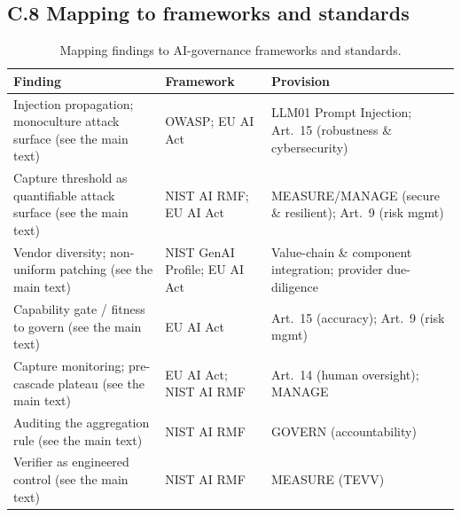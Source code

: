 \documentclass[11pt,a4paper]{article}
\begin{document}
\subsection*{C.8 Mapping to frameworks and standards}
\begin{table}[t]
\caption{Mapping findings to AI-governance frameworks and standards.}
\label{tab:policy}
\small
\begin{tabular}{@{}p{2.7cm}p{2.0cm}p{2.4cm}@{}}
\toprule
\textbf{Finding} & \textbf{Framework} & \textbf{Provision} \\
\midrule
Injection propagation; monoculture attack surface (see the main text) & OWASP; EU AI Act & LLM01 Prompt Injection; Art.~15 (robustness \& cybersecurity) \\
Capture threshold as quantifiable attack surface (see the main text) & NIST AI RMF; EU AI Act & MEASURE/MANAGE (secure \& resilient); Art.~9 (risk mgmt) \\
Vendor diversity; non-uniform patching (see the main text) & NIST GenAI Profile; EU AI Act & Value-chain \& component integration; provider due-diligence \\
Capability gate / fitness to govern (see the main text) & EU AI Act & Art.~15 (accuracy); Art.~9 (risk mgmt) \\
Capture monitoring; pre-cascade plateau (see the main text) & EU AI Act; NIST AI RMF & Art.~14 (human oversight); MANAGE \\
Auditing the aggregation rule (see the main text) & NIST AI RMF & GOVERN (accountability) \\
Verifier as engineered control (see the main text) & NIST AI RMF & MEASURE (TEVV) \\
\bottomrule
\end{tabular}
\end{table}


\end{document}
